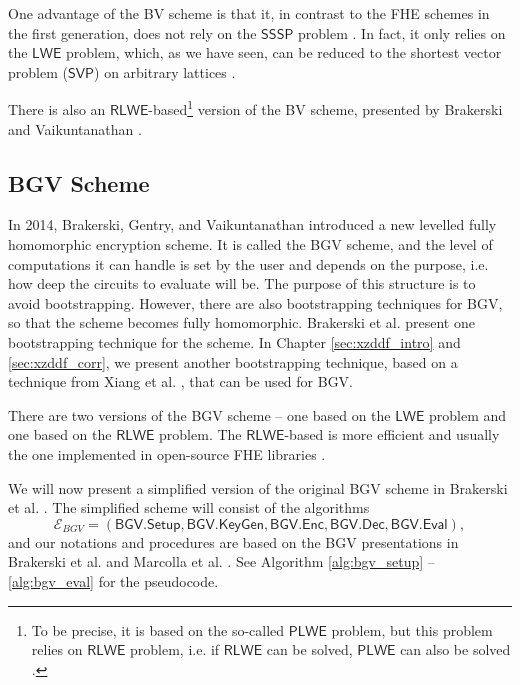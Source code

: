 One advantage of the BV scheme is that it, in contrast to the FHE schemes in the first generation, does not rely on the $\mathsf{SSSP}$ problem \cite{cite:QianFHE}. In fact, it only relies on the $\mathsf{LWE}$ problem, which, as we have seen, can be reduced to the shortest vector problem ($\mathsf{SVP}$) on arbitrary lattices \cite{cite:bv_lwe}.

There is also an $\mathsf{RLWE}$-based\footnote[1]{To be precise, it is based on the so-called $\mathsf{PLWE}$ problem, but this problem relies on $\mathsf{RLWE}$ problem, i.e. if $\mathsf{RLWE}$ can be solved, $\mathsf{PLWE}$ can also be solved \cite{cite:bv_rlwe}.} version of the BV scheme, presented by Brakerski and Vaikuntanathan \cite{cite:bv_rlwe}. %



\subsection{BGV Scheme}\label{sec:bgv}

In 2014, Brakerski, Gentry, and Vaikuntanathan \cite{cite:bgv} introduced a new levelled fully homomorphic encryption scheme. It is called the BGV scheme, and the level of computations it can handle is set by the user and depends on the purpose, i.e. how deep the circuits to evaluate will be. The purpose of this structure is to avoid bootstrapping. However, there are also bootstrapping techniques for BGV, so that the scheme becomes fully homomorphic. Brakerski et al. \cite{cite:bgv} present one bootstrapping technique for the scheme. In Chapter \ref{sec:xzddf_intro} and \ref{sec:xzddf_corr}, we present another bootstrapping technique, based on a technique from Xiang et al. \cite{cite:fast_bootstrap_crypto23}, that can be used for BGV.

There are two versions of the BGV scheme -- one based on the $\mathsf{LWE}$ problem and one based on the $\mathsf{RLWE}$ problem. The $\mathsf{RLWE}$-based is more efficient and usually the one implemented in open-source FHE libraries \cite{cite:QianFHE}.


We will now present a simplified version of the original BGV scheme in Brakerski et al. \cite{cite:bgv}. The simplified scheme will consist of the algorithms $$\mathcal{E}_{BGV} = (\mathsf{BGV.Setup, BGV.KeyGen, BGV.Enc, BGV.Dec, BGV.Eval}),$$ and our notations and procedures are based on the BGV presentations in Brakerski et al. \cite{cite:bgv} and Marcolla et al. \cite{cite:QianFHE}. See Algorithm \ref{alg:bgv_setup} -- \ref{alg:bgv_eval} for the pseudocode.


